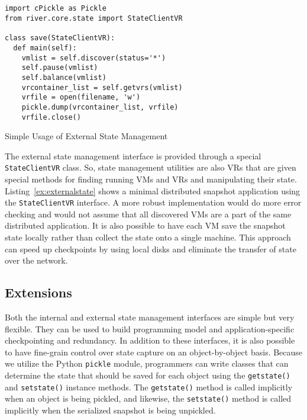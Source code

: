 \begin{listing}
\scriptsize
\begin{verbatim}


import cPickle as Pickle
from river.core.state import StateClientVR

class save(StateClientVR):
  def main(self):
    vmlist = self.discover(status='*')
    self.pause(vmlist)
    self.balance(vmlist)
    vrcontainer_list = self.getvrs(vmlist)
    vrfile = open(filename, 'w')
    pickle.dump(vrcontainer_list, vrfile)
    vrfile.close()
\end{verbatim}
\normalsize
\caption{Simple Usage of External State Management}
\label{ex:externalstate}
\end{listing}

The external state management interface is provided through a special \verb+StateClientVR+ class.  So, state management utilities are also VRs that are given special methods for finding running VMs and VRs and manipulating their state.  Listing~\ref{ex:externalstate} shows a minimal distributed snapshot application using the \verb+StateClientVR+ interface.  A more robust implementation would do more error checking and would not assume that all discovered VMs are a part of the same distributed application.  It is also possible to have each VM save the snapshot state locally rather than collect the state onto a single machine.  This approach can speed up checkpoints by using local disks and eliminate the transfer of state over the network.

\subsection{Extensions}

Both the internal and external state management interfaces are simple but
very flexible.  They can be used to build programming model and
application-specific checkpointing and redundancy.  In addition to these
interfaces, it is also possible to have fine-grain control over state
capture on an object-by-object basis.  Because we utilize the Python
\verb+pickle+ module, programmers can write classes that can determine the state that should be saved for each object using the \verb+getstate()+ and \verb+setstate()+ instance methods.  The \verb+getstate()+ method is called implicitly when an object is being pickled, and likewise, the \verb+setstate()+ method is called implicitly when the serialized snapshot is being unpickled.

